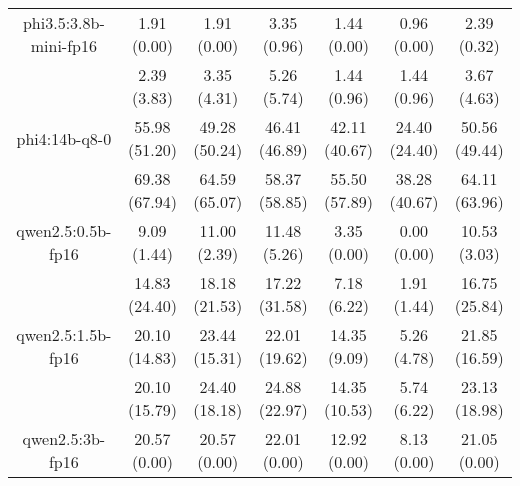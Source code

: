\begin{table}[]
{\begin{tabular}{ccccccc}
        \multicolumn{1}{c|}{phi3.5:3.8b-mini-fp16} & 1.91 (0.00) & 1.91 (0.00) & \multicolumn{1}{c|}{3.35 (0.96)} & 1.44 (0.00) & \multicolumn{1}{c|}{0.96 (0.00)} & 2.39 (0.32) \\
        
        

        \multicolumn{1}{c|}{} & 2.39 (3.83) & 3.35 (4.31) & \multicolumn{1}{c|}{5.26 (5.74)} & 1.44 (0.96) & \multicolumn{1}{c|}{1.44 (0.96)} & 3.67 (4.63) \\
        \cline{1-7}
        

        \multicolumn{1}{c|}{phi4:14b-q8-0} & 55.98 (51.20) & 49.28 (50.24) & \multicolumn{1}{c|}{46.41 (46.89)} & 42.11 (40.67) & \multicolumn{1}{c|}{24.40 (24.40)} & 50.56 (49.44) \\
        
        

        \multicolumn{1}{c|}{} & 69.38 (67.94) & 64.59 (65.07) & \multicolumn{1}{c|}{58.37 (58.85)} & 55.50 (57.89) & \multicolumn{1}{c|}{38.28 (40.67)} & 64.11 (63.96) \\
        \cline{1-7}
        

        \multicolumn{1}{c|}{qwen2.5:0.5b-fp16} & 9.09 (1.44) & 11.00 (2.39) & \multicolumn{1}{c|}{11.48 (5.26)} & 3.35 (0.00) & \multicolumn{1}{c|}{0.00 (0.00)} & 10.53 (3.03) \\
        
        

        \multicolumn{1}{c|}{} & 14.83 (24.40) & 18.18 (21.53) & \multicolumn{1}{c|}{17.22 (31.58)} & 7.18 (6.22) & \multicolumn{1}{c|}{1.91 (1.44)} & 16.75 (25.84) \\
        \cline{1-7}
        

        \multicolumn{1}{c|}{qwen2.5:1.5b-fp16} & 20.10 (14.83) & 23.44 (15.31) & \multicolumn{1}{c|}{22.01 (19.62)} & 14.35 (9.09) & \multicolumn{1}{c|}{5.26 (4.78)} & 21.85 (16.59) \\
        
        

        \multicolumn{1}{c|}{} & 20.10 (15.79) & 24.40 (18.18) & \multicolumn{1}{c|}{24.88 (22.97)} & 14.35 (10.53) & \multicolumn{1}{c|}{5.74 (6.22)} & 23.13 (18.98) \\
        \cline{1-7}
        

        \multicolumn{1}{c|}{qwen2.5:3b-fp16} & 20.57 (0.00) & 20.57 (0.00) & \multicolumn{1}{c|}{22.01 (0.00)} & 12.92 (0.00) & \multicolumn{1}{c|}{8.13 (0.00)} & 21.05 (0.00) \\
        

\end{tabular}}
\end{table}

